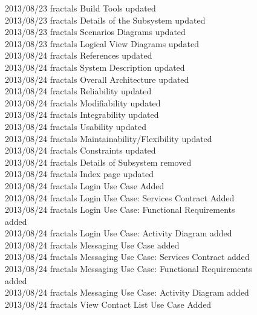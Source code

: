 \documentclass[29pt,a4paper]{moderncv}
\begin{document}
\begin{tabbing}
2013/08/23  \>fractals \> Build Tools updated\\
2013/08/23  \>fractals \> Details of the Subsystem updated\\
2013/08/23  \>fractals \> Scenarios Diagrams updated\\
2013/08/23  \>fractals \> Logical View Diagrams updated\\
2013/08/24  \>fractals \> References updated\\
2013/08/24  \>fractals \> System Description updated\\
2013/08/24  \>fractals \> Overall Architecture updated\\
2013/08/24  \> fractals \> Reliability updated\\
2013/08/24  \> fractals \>Modifiability updated\\
2013/08/24  \> fractals \> Integrability updated\\
2013/08/24  \> fractals \> Usability updated\\
2013/08/24  \> fractals \> Maintainability/Flexibility updated\\
2013/08/24  \> fractals \> Constraints updated\\
2013/08/24  \> fractals \> Details of Subsystem removed\\
2013/08/24  \> fractals \> Index page updated\\
2013/08/24  \> fractals \> Login Use Case Added\\
2013/08/24  \> fractals \> Login Use Case: Services Contract Added \\
2013/08/24  \> fractals \> Login Use Case: Functional Requirements \\ \> \> \> added\\
2013/08/24  \> fractals \> Login Use Case: Activity Diagram added\\
2013/08/24  \> fractals \> Messaging Use Case added\\
2013/08/24  \> fractals \> Messaging Use Case: Services Contract added\\
2013/08/24  \> fractals \> Messaging Use Case: Functional Requirements\\ \> \> \> added\\
2013/08/24  \> fractals \> Messaging Use Case: Activity Diagram added\\
2013/08/24  \> fractals \> View Contact List Use Case Added\\

\end{tabbing}
\end{document}
